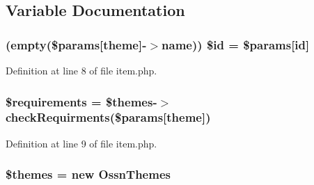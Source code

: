 \subsection{Variable Documentation}
\subsubsection[{\texorpdfstring{\$id}{$id}}]{ (empty(\$params\mbox{[}\textquotesingle{}theme\textquotesingle{}\mbox{]}-\/$>${\bf name})) \$id = \$params\mbox{[}\textquotesingle{}id\textquotesingle{}\mbox{]}}\hypertarget{system_2plugins_2default_2admin_2themes_2list_2item_8php_aff5afe90f2deea121e79e3e3e12c21aa}{}\label{system_2plugins_2default_2admin_2themes_2list_2item_8php_aff5afe90f2deea121e79e3e3e12c21aa}


Definition at line 8 of file item.\+php.

\subsubsection[{\texorpdfstring{\$requirements}{$requirements}}]{\setlength{\rightskip}{0pt plus 5cm}\$requirements = \$themes-\/$>$check\+Requirments(\$params\mbox{[}\textquotesingle{}theme\textquotesingle{}\mbox{]})}\hypertarget{system_2plugins_2default_2admin_2themes_2list_2item_8php_a244d94e62cffe97e11aa1633b809dfa1}{}\label{system_2plugins_2default_2admin_2themes_2list_2item_8php_a244d94e62cffe97e11aa1633b809dfa1}


Definition at line 9 of file item.\+php.

\subsubsection[{\texorpdfstring{\$themes}{$themes}}]{\setlength{\rightskip}{0pt plus 5cm}\$themes = new {\bf Ossn\+Themes}}\hypertarget{system_2plugins_2default_2admin_2themes_2list_2item_8php_ab8a3a0009c9eedf2350ba849c39c0580}{}\label{system_2plugins_2default_2admin_2themes_2list_2item_8php_ab8a3a0009c9eedf2350ba849c39c0580}



